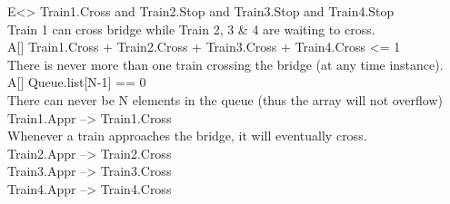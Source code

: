 E<> Train1.Cross and Train2.Stop and Train3.Stop and Train4.Stop \\
Train 1 can cross bridge while Train 2, 3 & 4 are waiting to cross. \\
A[] Train1.Cross + Train2.Cross + Train3.Cross + Train4.Cross <= 1 \\
There is never more than one train crossing the bridge (at any time instance). \\
A[] Queue.list[N-1] == 0 \\
There can never be N elements in the queue (thus the array will not overflow) \\
Train1.Appr --> Train1.Cross \\
Whenever a train approaches the bridge, it will eventually cross. \\
Train2.Appr --> Train2.Cross \\
Train3.Appr --> Train3.Cross \\
Train4.Appr --> Train4.Cross \\




\newpage
{}

\parindent0pt
%


